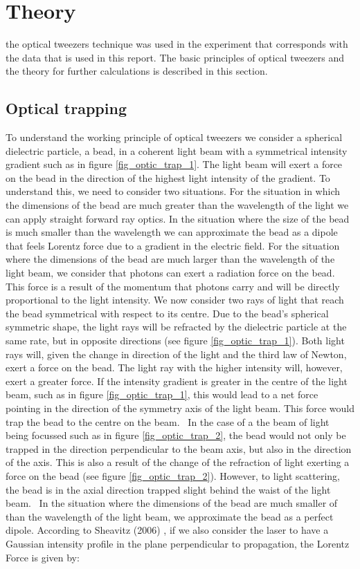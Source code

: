 \section{Theory}

 the optical tweezers technique was used in the experiment that corresponds with the data that is used in this report. The basic principles of optical tweezers and the theory for further calculations is described in this section.\\

\subsection{Optical trapping}
To understand the working principle of optical tweezers we consider a spherical dielectric particle, a bead, in a coherent light beam with a symmetrical intensity gradient such as in figure \ref{fig_optic_trap_1}. The light beam will exert a force on the bead in the direction of the highest light intensity of the gradient. To understand this, we need to consider two situations. For the situation in which the dimensions of the bead are much greater than the wavelength of the light we can apply straight forward ray optics. In the situation where the size of the bead is much smaller than the wavelength we can approximate the bead as a dipole that feels Lorentz force due to a gradient in the electric field.
For the situation where the dimensions of the bead are much larger than the wavelength of the light beam, we consider that photons can exert a radiation force on the bead. This force is a result of the momentum that photons carry  and will be directly proportional to the light intensity. We now consider two rays of light that reach the bead symmetrical with respect to its centre. Due to the bead's spherical symmetric shape, the light rays will be refracted by the dielectric particle at the same rate, but in opposite directions (see figure \ref{fig_optic_trap_1}). Both light rays will, given the change in direction of the light and the third law of Newton, exert a force on the bead. The light ray with the higher intensity will, however, exert a greater force. If the intensity gradient is greater in the centre of the light beam, such as in figure \ref{fig_optic_trap_1}, this would lead to a net force pointing in the direction of the symmetry axis of the light beam. This force would trap the bead to the centre on the beam. \
In the case of a the beam of light being focussed such as in figure \ref{fig_optic_trap_2}, the bead would not only be trapped in the direction perpendicular to the beam axis, but also in the direction of the axis. This is also a result of the change of the refraction of light exerting a force on the bead (see figure \ref{fig_optic_trap_2}). However, to light scattering, the bead is in the axial direction trapped slight behind the waist of the light beam.\cite{sheavitz} \
In the situation where the dimensions of the bead are much smaller of than the wavelength of the light beam, we approximate the bead as a perfect dipole. According to Sheavitz (2006) \cite{sheavitz}, if we also consider the laser to have a Gaussian intensity profile in the plane perpendicular to propagation, the Lorentz Force is given by:

